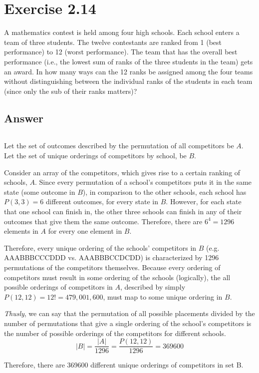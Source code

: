 \documentclass{article}
\begin{document}
\section*{Exercise 2.14}
			
A mathematics contest is held among four high schools. Each school enters a team of three students. The twelve contestants are ranked from 1 (best performance) to 12 (worst performance). The team that has the overall best performance (i.e., the lowest sum of ranks of the three students in the team) gets an award. In how many ways can the 12 ranks be assigned among the four teams without distinguishing between the individual ranks of the students in each team (since only the sub of their ranks matters)?
\subsection*{Answer}$\ $

Let the set of outcomes described by the permutation of all competitors be $A$. Let the set of unique orderings of competitors by school, be $B$. 

Consider an array of the competitors, which gives rise to a certain ranking of schools, $A$. Since every permutation of a school's competitors puts it in the same state (some outcome in $B$), in comparison to the other schools, each school has $P(3,3) = 6$ different outcomes, for every state in $B$. However, for each state that one school can finish in, the other three schools can finish in any of their outcomes that give them the same outcome. Therefore, there are $6^4 = 1296$ elements in $A$ for every one element in $B$. 

Therefore, every unique ordering of the schools' competitors in $B$ (e.g. AAABBBCCCDDD vs. AAABBBCCDCDD) is characterized by 1296 permutations of the competitors themselves. Because every ordering of competitors must result in some ordering of the schools (logically), the all possible orderings of competitors in $A$, described by simply $P(12,12) = 12! = 479,001,600$, must map to some unique ordering in $B$.

\textit{Thusly}, we can say that the permutation of all possible placements divided by the number of permutations that give a single ordering of the school's competitors is the number of possible orderings of the competitors for different schools.
\[ |B| = \frac{|A|}{1296} = \frac{P(12,12)}{1296} = 369600 \]

Therefore, there are 369600 different unique orderings of competitors in set B.
\end{document}
